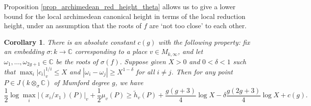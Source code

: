 \documentclass{article} %
\newtheorem{corollary}[proposition]{Corollary}
\numberwithin{equation}{section}
\newcommand{\bC}{\mathbb{C}}
\begin{document}
Proposition \ref{prop_archimedean_red_height_theta} allows us to give a lower bound for the local archimedean canonical height in terms of the local reduction height, under an assumption that the roots of $f$ are `not too close' to each other.

\begin{corollary}\label{cor_generic_reduction_height_vs_canonical_height}
There is an absolute constant $c(g)$ with the following property: fix an embedding $\sigma : k \to \bC$ corresponding to a place $v \in M_{k, \infty}$, and let $\omega_1, \dots, \omega_{2g+1} \in \bC$ be the roots of $\sigma(f)$. Suppose given $X > 0$ and $0< \delta < 1$ such that $\max_i | c_i |_v^{1/i} \leq X$ and $|\omega_i - \omega_j| \geq X^{1-\delta}$ for all $i \neq j$. Then for any point $P \in J(k \otimes_\sigma \bC)$ of Mumford degree $g$, we have
\[  \frac{1}{2} \log \max_i | (x_i / x_1)(P) |_v + \frac{1}{2} \mu_v(P) \geq \widetilde{h}_v(P) + \frac{g(g+3)}{4} \log X - \delta \frac{g(2g+3)}{4} \log X + c(g). \]
\end{corollary}
\end{document}
